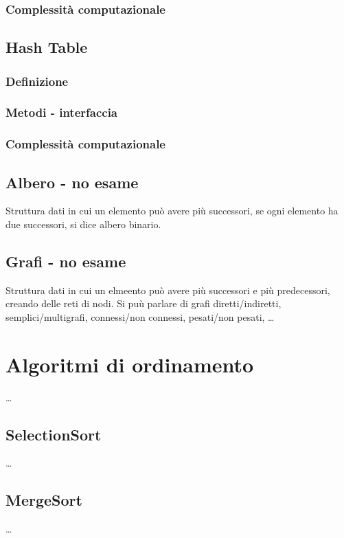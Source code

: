 \documentclass{article}
\begin{document}
\subsubsection*{Complessità computazionale}

\subsection{Hash Table}
\subsubsection*{Definizione}
\subsubsection*{Metodi - interfaccia}
\subsubsection*{Complessità computazionale}

\newpage

\subsection{Albero - no esame}
Struttura dati in cui un elemento può avere più successori, se ogni elemento ha due successori, si dice albero binario.

\subsection{Grafi - no esame}
Struttura dati in cui un elmeento può avere più successori e più predecessori, creando delle reti di nodi.
Si puù parlare di grafi diretti/indiretti, semplici/multigrafi, connessi/non connessi, pesati/non pesati, \dots

\newpage

\section{Algoritmi di ordinamento}
\dots

\subsection{SelectionSort}
\dots

\subsection{MergeSort}
\dots
\end{document}
